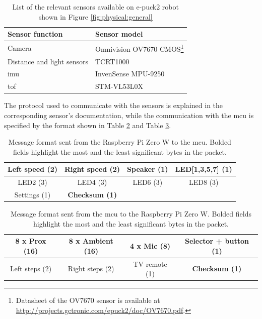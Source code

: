 \begin{table}[H]
    \centering
    \begin{tabular}{|l|l|}
        \hline
        \textbf{Sensor function} & \textbf{Sensor model} \\
        \hline
        Camera & Omnivision OV7670 CMOS\footnote{Datasheet of the OV7670 sensor is available at \url{http://projects.gctronic.com/epuck2/doc/OV7670.pdf}.} \\
        \hline
        Distance and light sensors & TCRT1000 \\
        \hline
        \ac{imu} & InvenSense MPU-9250 \\
        \hline
        \ac{tof} & STM-VL53L0X \cite{lakovic_application_2019} \\
        \hline
    \end{tabular}
    \caption{List of the relevant sensors available on e-puck2 robot shown in Figure \ref{fig:physical:general}}
    \label{tab:physical:sensors}
\end{table}

The protocol used to communicate with the sensors is explained in the corresponding sensor's documentation, while the communication with the \ac{mcu} is specified by the format shown in Table \ref{tab:physical:rpi_to_mcu} and Table \ref{tab:physical:mcu_to_rpi}.

\begin{table}[H]
    \centering
    \begin{tabular}{c|c|c|c}
    \hline
    \textbf{Left speed (2)} & Right speed (2) & Speaker (1) & LED[1,3,5,7] (1)  \\
    \hline
    LED2 (3) & LED4 (3) & LED6 (3) & LED8 (3) \\
    \hline
    Settings (1) & \textbf{Checksum (1)} & & \\
    \hline
    \end{tabular}
    \caption[Message format sent from the Raspberry Pi Zero W to the \ac{mcu}]{Message format sent from the Raspberry Pi Zero W to the \ac{mcu}. Bolded fields highlight the most and the least significant bytes in the packet.}
    \label{tab:physical:rpi_to_mcu}
\end{table}

\begin{table}[H]
    \centering
    \begin{tabular}{c|c|c|c}
    \hline
    \textbf{8 x Prox (16)} & 8 x Ambient (16) & 4 x Mic (8) & Selector + button (1) \\
    \hline
    Left steps (2) & Right steps (2) & TV remote (1) & \textbf{Checksum (1)} \\
    \hline
    \end{tabular}
    \caption[Message format sent from the \ac{mcu} to the Raspberry Pi Zero W]{Message format sent from the \ac{mcu} to the Raspberry Pi Zero W. Bolded fields highlight the most and the least significant bytes in the packet.}
    \label{tab:physical:mcu_to_rpi}
\end{table}

